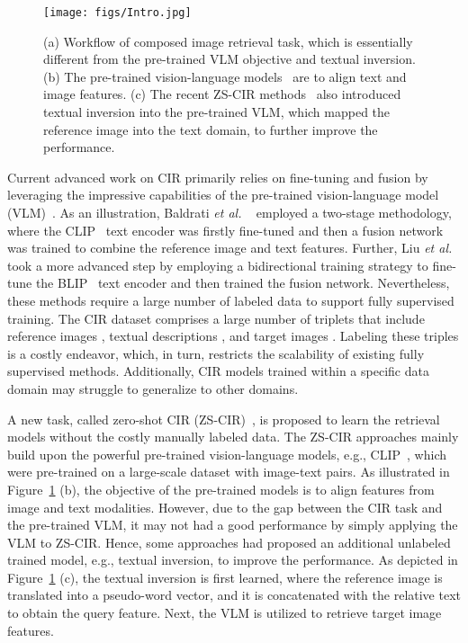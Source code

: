 \documentclass[10pt,twocolumn,letterpaper]{article}
\begin{document}
\begin{figure}[t]
    \centering
    \texttt{[image: figs/Intro.jpg]}
    \caption{(a) Workflow of composed image retrieval task, which is essentially different from the pre-trained VLM objective and textual inversion. (b) The pre-trained vision-language models~\cite{li2022blip, radford2021clip} are to align text and image features. (c) The recent ZS-CIR methods~\cite{Baldrati_2023_ICCV, saito2023pic2word} also introduced textual inversion into the pre-trained VLM, which mapped the reference image into the text domain, to further improve the performance.}
    \label{fig:intro}
\end{figure}

Current advanced work on CIR primarily relies on fine-tuning and fusion by leveraging the impressive capabilities of the pre-trained vision-language model (VLM)~\cite{baldrati2022effective, baldrati2022conditioned, liu2023bi}. As an illustration, Baldrati \textit{et al.} ~\cite{baldrati2022conditioned} employed a two-stage methodology, where the CLIP~\cite{radford2021clip} text encoder was firstly fine-tuned and then a fusion network was trained to combine the reference image and text features. Further, Liu \textit{et al.}~\cite{liu2023bi} took a more advanced step by employing a bidirectional training strategy to fine-tune the BLIP~\cite{li2022blip} text encoder and then trained the fusion network. Nevertheless, these methods require a large number of labeled data to support fully supervised training. The CIR dataset comprises a large number of triplets  that include reference images , textual descriptions , and target images . Labeling these triples is a costly endeavor, which, in turn, restricts the scalability of existing fully supervised methods. Additionally, CIR models trained within a specific data domain may struggle to generalize to other domains. 

A new task, called zero-shot CIR (ZS-CIR)~\cite{Baldrati_2023_ICCV, saito2023pic2word}, is proposed to learn the retrieval models without the costly manually labeled data. The ZS-CIR approaches mainly build upon the powerful pre-trained vision-language models, e.g., CLIP~\cite{radford2021clip}, which were pre-trained on a large-scale dataset with image-text pairs. As illustrated in Figure~\ref{fig:intro} (b), the objective of the pre-trained models is to align features from image and text modalities. However, due to the gap between the CIR task and the pre-trained VLM, it may not had a good performance by simply applying the VLM to ZS-CIR. Hence, some approaches \cite{Baldrati_2023_ICCV, saito2023pic2word} had proposed an additional unlabeled trained model, e.g., textual inversion, to improve the performance. As depicted in Figure~\ref{fig:intro} (c), the textual inversion is first learned, where the reference image is translated into a pseudo-word vector, and it is concatenated with the relative text to obtain the query feature. Next, the VLM is utilized to retrieve target image features. 
\end{document}
